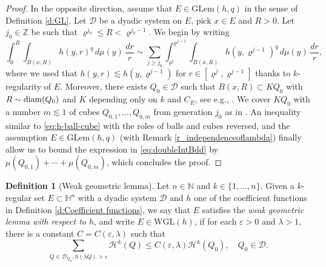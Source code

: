 \documentclass[12pt]{amsart}
\newcommand{\diam}{{\rm diam}}
\renewcommand{\rho}{\varrho}
\numberwithin{equation}{section}
\theoremstyle{plain}
\theoremstyle{definition}
\newtheorem{definition}[theorem]{Definition}
\theoremstyle{remark}
\begin{document}
\begin{proof}
\medskip

In the opposite direction, assume that $E\in\mathrm{GLem}(h,q)$ in the sense of Definition \ref{d:GL}. Let $\mathcal{D}$  be a dyadic system on $E$, pick $x\in E$ and $R>0$. Let $j_0\in \mathbb{Z}$ be such that $\rho^{j_0}\leq R<\rho^{j_0-1}$. We begin by writing
\begin{equation}\label{eq:doubleIntBdd}
    \int_0^R \int_{B(x,R)} h(y,r)^q\, d\mu(y)\, \frac{dr}{r}\sim \sum_{j\geq j_0} \int_{\rho^j}^{\rho^{j-1}}\int_{B(x,R)}h(y,\rho^{j-1})^q\,d\mu(y)\,\frac{dr}{r},
\end{equation}
where we used that $h(y,r)\lesssim h(y,\rho^{j-1})$ for $r\in [\rho^{j},\rho^{j-1}]$ thanks to $k$-regularity of $E$. Moreover, there exists $Q_0\in \mathcal{D}$ such that $B(x,R) \subset K Q_0$ with $R \sim \diam(Q_0)$ and $K$ depending only on $k$ and $C_E$, see e.g., \cite[(2.9)]{FV1}. We cover $KQ_0$ with a number $m \lesssim 1$ of cubes $Q_{0,1},\ldots,Q_{0,m}$ from generation $j_0$ as in \cite[(2.12)]{FV1}. An inequality similar to \eqref{eq:h-ball-cube} with the roles of balls and cubes reversed, and the assumption $E\in\mathrm{GLem}(h,q)$ (with Remark \ref{r_independenceoflambda}) finally allow us to bound the expression in \eqref{eq:doubleIntBdd} by $\mu(Q_{0,1})+\cdots + \mu(Q_{0,m}) $, which concludes the proof.
\end{proof}





\begin{definition}[Weak geometric lemma]\label{d:WGL} Let $n\in \mathbb{N}$ and $k\in \{1,\ldots,n\}$.
Given  a $k$-regular set $E\subset \mathbb{H}^n$ with a dyadic system $\mathcal{D}$ %
 and   $h$ one of the coefficient functions in Definition \ref{d:Coefficient functions}, we say that $E$ satisfies the
\emph{weak geometric lemma with respect to $h$}, and  write
$E\in\mathrm{WGL}(h)$, if for each $\varepsilon>0$ and $\lambda>1$, there is a constant $C=C(\varepsilon,\lambda)$ such that
\begin{equation}\label{eq:WGL}
\sum_{Q\in \mathcal{D}_{Q_0}, h(\lambda Q)>\varepsilon} \mathcal{H}^k(Q) \leq C(\varepsilon,\lambda) \mathcal{H}^k(Q_0), \quad
Q_0\in \mathcal{D}.
\end{equation}
\end{definition}
\end{document}

